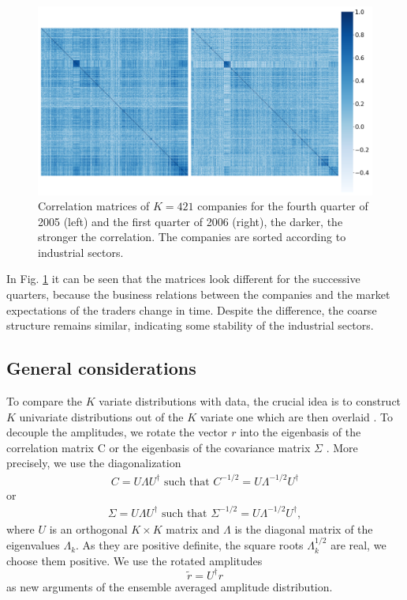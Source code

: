 \begin{figure}[htbp]
    \centering
    \includegraphics[width=\columnwidth]
    {figures/03_correlation_matrix.png}
    \caption{Correlation matrices of $K = 421$ companies for the fourth quarter
             of 2005 (left) and the first quarter of 2006 (right), the darker,
             the stronger the correlation. The companies are sorted according
             to industrial sectors.}
    \label{fig:correlation_matrices}
\end{figure}

In Fig. \ref{fig:correlation_matrices} it can be seen that the matrices look
different for the successive quarters, because the business relations between
the companies and the market expectations of the traders change in time.
Despite the difference, the coarse structure remains similar, indicating some
stability of the industrial sectors.


\subsection{General considerations}\label{subsec:general_considerations}

To compare the $K$ variate distributions with data, the crucial idea is to
construct $K$ univariate distributions out of the $K$ variate one which are
then overlaid \cite{exact_distributions_guhr}. To decouple the amplitudes, we
rotate the vector $r$ into the eigenbasis of the correlation matrix C or the
eigenbasis of the covariance matrix $\Sigma$
\cite{non_stationarity_fin_guhr,exact_distributions_guhr}. More precisely, we
use the diagonalization
\begin{align}
    C = U \Lambda U^{\dagger} \text{ such that }
    C^{-1/2} = U \Lambda^{-1/2} U^{\dagger}
\end{align}
or
\begin{align}
    \Sigma = U \Lambda U^{\dagger} \text{ such that }
    \Sigma^{-1/2} = U \Lambda^{-1/2} U^{\dagger},
\end{align}
where $U$ is an orthogonal $K \times K$ matrix and $\Lambda$ is the diagonal
matrix of the eigenvalues $\Lambda_{k}$. As they are positive definite, the
square roots $\Lambda_{k}^{1/2}$ are real, we choose them positive. We use the
rotated amplitudes
\begin{equation}
    \tilde{r} = U^{\dagger} r
\end{equation}
as new arguments of the ensemble averaged amplitude distribution.

